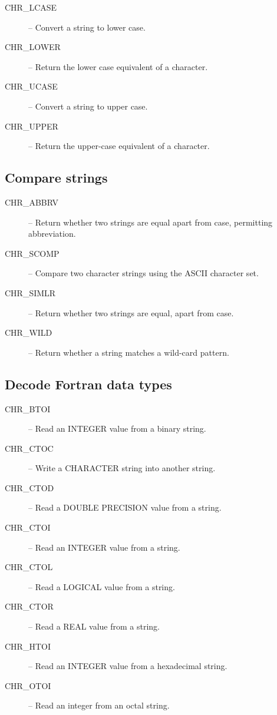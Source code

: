 \begin {description}
\item [CHR\_LCASE] -- Convert a string to lower case.
\item [CHR\_LOWER] -- Return the lower case equivalent of a character.
\item [CHR\_UCASE] -- Convert a string to upper case.
\item [CHR\_UPPER] -- Return the upper-case equivalent of a character.
\end {description}


\subsection {Compare strings}

\begin {description}
\item [CHR\_ABBRV] -- Return whether two strings are equal apart from case,
permitting  abbreviation.
\item [CHR\_SCOMP] -- Compare two character strings using the ASCII character
set.
\item [CHR\_SIMLR] -- Return whether two strings are equal, apart from case.
\item [CHR\_WILD] -- Return whether a string matches a wild-card pattern.
\end {description}


\subsection {Decode Fortran data types}

\begin {description}
\item [CHR\_BTOI] -- Read an INTEGER value from a binary string.
\item [CHR\_CTOC] -- Write a CHARACTER string into another string.
\item [CHR\_CTOD] -- Read a DOUBLE PRECISION value from a string.
\item [CHR\_CTOI] -- Read an INTEGER value from a string.
\item [CHR\_CTOL] -- Read a LOGICAL value from a string.
\item [CHR\_CTOR] -- Read a REAL value from a string.
\item [CHR\_HTOI] -- Read an INTEGER value from a hexadecimal string.
\item [CHR\_OTOI] -- Read an integer from an octal string.
\end {description}


